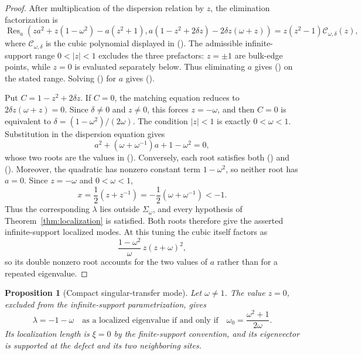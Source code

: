 \documentclass[twoside,10pt]{article}
\numberwithin{equation}{section}
\theoremstyle{slbody}
\newtheorem{proposition}[theorem]{Proposition}
\theoremstyle{definition}
\theoremstyle{remark}
\renewcommand{\eqref}[1]{%
  \textup{{\normalfont(\oldstylenums{\ref{#1}}}\normalfont)}}
\begin{document}
\begin{proof}
After multiplication of the dispersion relation by $z$, the elimination
factorization is
\[
 \operatorname{Res}_a\!\left(
  za^2+z(1-\omega^2)-a(z^2+1),
  a(1-z^2+2\delta z)-2\delta z(\omega+z)
 \right)
 =z(z^2-1)\mathcal C_{\omega,\delta}(z),
\]
where $\mathcal C_{\omega,\delta}$ is the cubic polynomial displayed in
\eqref{eq:localization-cubic}.  The admissible infinite-support range
$0<|z|<1$ excludes the three prefactors: $z=\pm1$ are bulk-edge
points, while $z=0$ is evaluated separately below.  Thus eliminating
$a$ gives \eqref{eq:localization-cubic} on the stated range.  Solving
\eqref{eq:loc-match} for $a$ gives \eqref{eq:localization-recovery}.

Put $C=1-z^2+2\delta z$.  If $C=0$, the matching equation reduces to
$2\delta z(\omega+z)=0$.  Since $\delta\ne0$ and $z\ne0$, this forces
$z=-\omega$, and then $C=0$ is equivalent to
$\delta=(1-\omega^2)/(2\omega)$.  The condition $|z|<1$ is exactly
$0<\omega<1$.  Substitution in the dispersion equation gives
\[
 a^2+(\omega+\omega^{-1})a+1-\omega^2=0,
\]
whose two roots are the values in
\eqref{eq:localization-zero-denominator-roots}.  Conversely, each root
satisfies both \eqref{eq:loc-dispersion} and \eqref{eq:loc-match}.  Moreover,
the quadratic has nonzero constant term $1-\omega^2$, so neither root has
$a=0$.  Since $z=-\omega$ and $0<\omega<1$,
\[
 x=\frac12(z+z^{-1})=-\frac12(\omega+\omega^{-1})<-1.
\]
Thus the corresponding $\lambda$ lies outside $\Sigma_\omega$, and every
hypothesis of Theorem~\ref{thm:localization} is satisfied.  Both roots
therefore give the asserted infinite-support localized modes.
At this tuning the cubic itself factors as
\[
 \frac{1-\omega^2}{\omega}\,z(z+\omega)^2,
\]
so its double nonzero root accounts for the two values of $a$ rather
than for a repeated eigenvalue.
\end{proof}

\begin{proposition}[Compact singular-transfer mode]
\label{prop:compact-localization}
Let $\omega\ne1$.  The value $z=0$, excluded from the infinite-support
parametrization, gives
\begin{equation}\label{eq:compact-localization}
 \lambda=-1-\omega
 \quad\text{as a localized eigenvalue if and only if}\quad
 \omega_0=\frac{\omega^2+1}{2\omega}.
\end{equation}
Its localization length is $\xi=0$ by the finite-support convention, and
its eigenvector is supported at the defect and its two neighboring sites.
\end{proposition}
\end{document}
